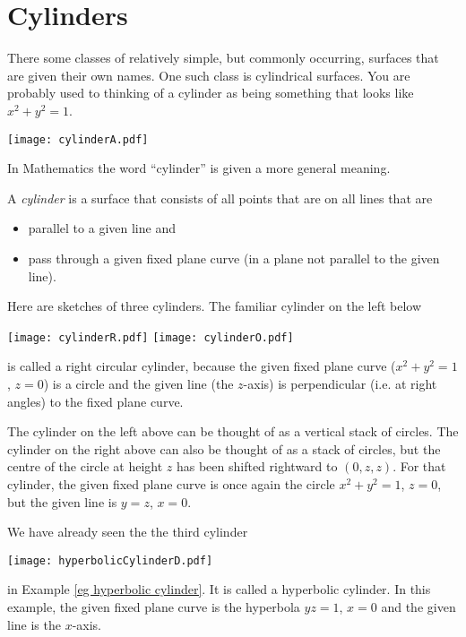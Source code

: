 \section{Cylinders}\label{sec cylinders}

There some classes of relatively simple, but commonly occurring, 
surfaces that are given their own names. One such class is cylindrical surfaces.
You are probably used to thinking of a cylinder as being something that looks 
like $x^2+y^2=1$. 
\begin{efig}
\begin{center}
   \texttt{[image: cylinderA.pdf]}
\end{center}
\end{efig}
In Mathematics the word ``cylinder'' is given a more general meaning.

\begin{defn}[Cylinder]\label{def cylinder}
A \emph{cylinder} is a surface that consists of all points that are 
on all lines that are
\begin{itemize}\itemsep1pt \parskip0pt 
\item   parallel to a given line and
\item   pass through a given fixed plane curve (in a plane not parallel
to the given line).
\end{itemize}
\end{defn}

\begin{eg}\label{eg cylinders}
Here are sketches of three cylinders.
The familiar cylinder on the left below
\begin{efig}
\begin{center}
   \texttt{[image: cylinderR.pdf]}\qquad
   \texttt{[image: cylinderO.pdf]}
\end{center}
\end{efig}
is called a right circular cylinder, because the given fixed plane curve
($x^2+y^2=1$, $z=0$)
is a circle and the given line (the $z$-axis) is perpendicular 
(i.e. at right angles) to the fixed plane curve.

The cylinder on the left above can be thought of as a vertical stack of 
circles. The cylinder on the right above can also be thought of as a stack 
of circles, but the centre of the circle at height $z$ has been shifted
rightward to $(0,z,z)$. For that cylinder, the given fixed plane curve 
is once again the circle $x^2+y^2=1$, $z=0$, but the given line is $y=z$, $x=0$.

We have already seen the the third cylinder 
\begin{efig}
\begin{center}
   \texttt{[image: hyperbolicCylinderD.pdf]}
\end{center}
\end{efig}
in Example \ref{eg hyperbolic cylinder}. It is called a hyperbolic cylinder.
In this example, the given fixed plane curve is the hyperbola $yz=1$, $x=0$
and the given line is the $x$-axis.
\end{eg}


